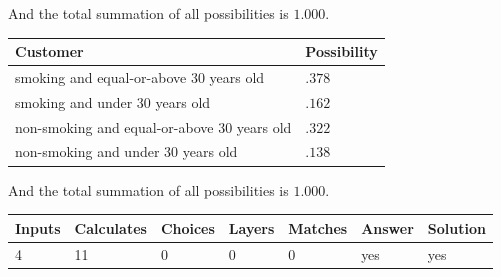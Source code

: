 \documentclass[12pt]{article}
\begin{document}
\noindent
And the total summation of all possibilities is $  %
1.000 $.
 
 
 
 
\noindent{}
 
 

 
 
 
\noindent{}
 
 

 
\noindent
\begin{tabular}{|l|l|}
\hline
Customer & Possibility \\
\hline
smoking  and  %
equal-or-above 30 years old &
  $ %
.378$ \\
\hline
smoking  and  %
under 30 years old &
  $ %
.162$ \\
\hline
 non-smoking and  %
equal-or-above 30 years old &
  $ %
.322$ \\
\hline
 non-smoking and  %
under 30 years old &
  $ %
.138$ \\
\hline
\end{tabular}
 
\noindent
 And the total summation of all possibilities is $  %
1.000 $.
 
 
 
\noindent{}
 
 

 
\vspace{0.3in}
   
   
   
   
\noindent\begin{tabular}{|l|l|l|l|l|l|l|}
 \hline
Inputs & Calculates & Choices & Layers & Matches & Answer & Solution \\ \hline
           4 & 
          11 & 
           0
  & 
           0 & 
           0 & 
  yes & 
  yes 
  \\ \hline
 \end{tabular}
   
   
   
   
\noindent{}
   
   
  
\end{document}
